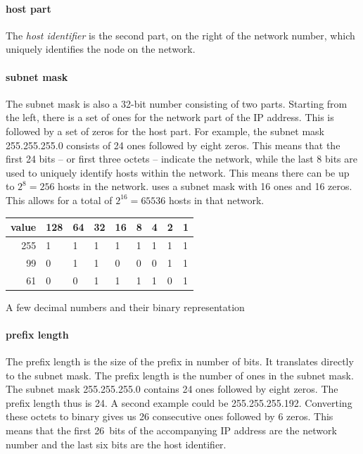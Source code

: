 \paragraph{host part}
The \emph{host identifier}%
is the second part, on the right of the network number, which uniquely identifies the node on the network.

\paragraph{subnet mask}
The subnet mask is also a 32-bit number consisting of two parts.
Starting from the left, there is a set of ones for the network part of the \acs{IP} address.
This is followed by a set of zeros for the host part.
For example, the subnet mask 255.255.255.0 consists of 24 ones followed by eight zeros.
This means that the first 24 bits -- or first three octets -- indicate the network, while the last 8 bits are used to uniquely identify hosts within the network.
This means there can be up to $2^8=256$ hosts in the network.
 uses a subnet mask with 16 ones and 16 zeros.
This allows for a total of $2^{16}=65536$ hosts in that network.

\begin{margintable}
\begin{tabular}{
   r
   p{5mm}@{ }
   p{4mm}@{ }
   p{4mm}@{ }
   p{4mm}@{ }
   p{3mm}@{ }
   p{3mm}@{ }
   p{3mm}@{ }
   p{3mm}@{ }
}
value & 128 & 64 & 32 & 16 & 8 & 4 & 2 & 1 \\
\midrule
  255 &   1 &  1 &  1 &  1 & 1 & 1 & 1 & 1 \\
   99 &   0 &  1 &  1 &  0 & 0 & 0 & 1 & 1 \\
   61 &   0 &  0 &  1 &  1 & 1 & 1 & 0 & 1 \\
\end{tabular}
\caption{A few decimal numbers and their binary representation}
\end{margintable}

\paragraph{prefix length}
The prefix length is the size of the prefix in number of bits.
It translates directly to the subnet mask.
The prefix length is the number of ones in the subnet mask.
The subnet mask 255.255.255.0 contains 24 ones followed by eight zeros.
The prefix length thus is 24.
A second example could be 255.255.255.192.
Converting these octets to binary gives us 26 consecutive ones followed by 6 zeros.
This means that the first 26~bits of the accompanying \acs{IP} address are the network number and the last six bits are the host identifier.

